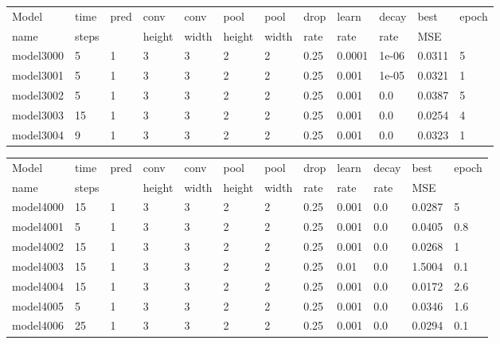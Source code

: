 \documentclass[12pt, twoside]{article}
\begin{document}
\begin{appendices}
	\begin{longtable}{|l|l|l|l|l|l|l|l|l|l|l|l|}
		\hline
		Model & time & pred & conv & conv   & pool & pool   & drop & learn & decay & best & epoch \\
		name & steps &     & height & width & height & width & rate & rate & rate & MSE & \\ \hline
		\endhead
		model3000 & 5 & 1 & 3 & 3 & 2 & 2 & 0.25 & 0.0001 & 1e-06 & 0.0311 & 5\\ \hline
		model3001 & 5 & 1 & 3 & 3 & 2 & 2 & 0.25 & 0.001 & 1e-05 & 0.0321 & 1\\ \hline
		model3002 & 5 & 1 & 3 & 3 & 2 & 2 & 0.25 & 0.001 & 0.0 & 0.0387 & 5\\ \hline
		model3003 & 15 & 1 & 3 & 3 & 2 & 2 & 0.25 & 0.001 & 0.0 & 0.0254 & 4\\ \hline
		model3004 & 9 & 1 & 3 & 3 & 2 & 2 & 0.25 & 0.001 & 0.0 & 0.0323 & 1\\ \hline
	\end{longtable}

\begin{longtable}{|l|l|l|l|l|l|l|l|l|l|l|l|}
	\hline
	Model & time & pred & conv & conv   & pool & pool   & drop & learn & decay & best & epoch \\
	name & steps &     & height & width & height & width & rate & rate & rate & MSE & \\ \hline
	\endhead
	model4000 & 15 & 1 & 3 & 3 & 2 & 2 & 0.25 & 0.001 & 0.0 & 0.0287 & 5\\ \hline
	model4001 & 5 & 1 & 3 & 3 & 2 & 2 & 0.25 & 0.001 & 0.0 & 0.0405 & 0.8\\ \hline
	model4002 & 15 & 1 & 3 & 3 & 2 & 2 & 0.25 & 0.001 & 0.0 & 0.0268 & 1\\ \hline
	model4003 & 15 & 1 & 3 & 3 & 2 & 2 & 0.25 & 0.01 & 0.0 & 1.5004 & 0.1\\ \hline
	model4004 & 15 & 1 & 3 & 3 & 2 & 2 & 0.25 & 0.001 & 0.0 & 0.0172 & 2.6\\ \hline
	model4005 & 5 & 1 & 3 & 3 & 2 & 2 & 0.25 & 0.001 & 0.0 & 0.0346 & 1.6\\ \hline
	model4006 & 25 & 1 & 3 & 3 & 2 & 2 & 0.25 & 0.001 & 0.0 & 0.0294 & 0.1\\ \hline
\end{longtable}

	

\end{appendices}
\end{document}
